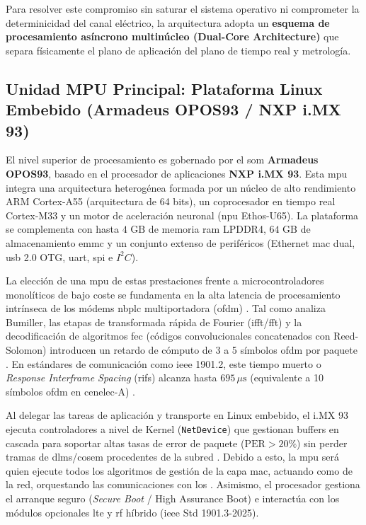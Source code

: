 Para resolver este compromiso sin saturar el sistema operativo ni comprometer la determinicidad del canal eléctrico, la arquitectura adopta un \textbf{esquema de procesamiento asíncrono multinúcleo (Dual-Core Architecture)} que separa físicamente el plano de aplicación del plano de tiempo real y metrología.

\subsection{Unidad MPU Principal: Plataforma Linux Embebido (Armadeus OPOS93 / NXP i.MX 93)}
\label{subsec:mpu_linux}

El nivel superior de procesamiento es gobernado por el \gls{som} \textbf{Armadeus OPOS93}, basado en el procesador de aplicaciones \textbf{NXP i.MX 93}. Esta \gls{mpu} integra una arquitectura heterogénea formada por un núcleo de alto rendimiento ARM Cortex-A55 (arquitectura de 64 bits), un coprocesador en tiempo real Cortex-M33 y un motor de aceleración neuronal (\gls{npu} Ethos-U65). La plataforma se complementa con hasta $4\text{ GB}$ de memoria \gls{ram} LPDDR4, $64\text{ GB}$ de almacenamiento \gls{emmc} y un conjunto extenso de periféricos (Ethernet \gls{mac} dual, \gls{usb} 2.0 OTG, \gls{uart}, \gls{spi} e $I^2C$).

La elección de una \gls{mpu} de estas prestaciones frente a microcontroladores monolíticos de bajo coste se fundamenta en la alta latencia de procesamiento intrínseca de los módems \gls{nbplc} multiportadora (\gls{ofdm}) \cite{7147624}. Tal como analiza Bumiller, las etapas de transformada rápida de Fourier (\gls{ifft}/\gls{fft}) y la decodificación de algoritmos \gls{fec} (códigos convolucionales concatenados con Reed-Solomon) introducen un retardo de cómputo de 3 a 5 símbolos \gls{ofdm} por paquete \cite{7147624}. En estándares de comunicación como \gls{ieee} 1901.2, este tiempo muerto o \textit{Response Interframe Spacing} (\gls{rifs}) alcanza hasta $695\,\mu\text{s}$ (equivalente a 10 símbolos \gls{ofdm} en \gls{cenelec}-A) \cite{7147624}.

Al delegar las tareas de aplicación y transporte en Linux embebido, el i.MX 93 ejecuta controladores a nivel de Kernel (\texttt{NetDevice}) que gestionan buffers en cascada para soportar altas tasas de error de paquete ($\text{PER} > 20\%$) sin perder tramas de  \gls{dlms}/\gls{cosem} procedentes de la subred \cite{7147624, 7778783}. Debido a esto, la \gls{mpu} será quien ejecute todos los algoritmos de gestión de la capa \gls{mac}, actuando como \textbf{} de la red, orquestando las comunicaciones con los . Asimismo, el procesador gestiona el arranque seguro (\textit{Secure Boot} / High Assurance Boot) e interactúa con los módulos opcionales \gls{lte} y \gls{rf} híbrido (\gls{ieee} Std 1901.3-2025).

